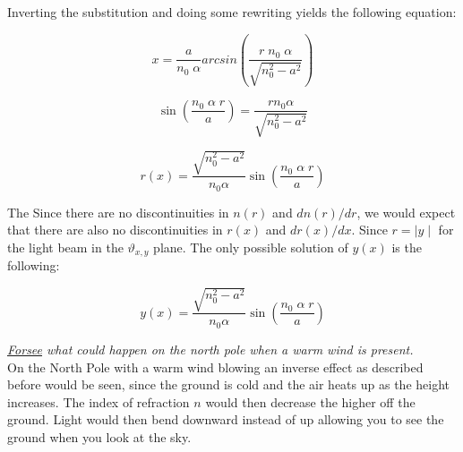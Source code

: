 \documentclass{article}
\begin{document}
Inverting the substitution and doing some rewriting yields the following equation:

\begin{equation}
	x = \frac{a}{n_0 \; \alpha} arcsin \left( \frac{r \; n_0 \; \alpha}{\sqrt{n_0^2-a^2}} \right)
\end{equation}

\begin{equation}
	\sin \left( \frac{n_0 \; \alpha \; r}{a} \right) =  \frac{r n_0 \alpha}{\sqrt{n_0^2-a^2}}
\end{equation}

\begin{equation}
	r(x) = \frac{\sqrt{n_0^2-a^2}}{n_0 \alpha} \sin \left( \frac{n_0 \; \alpha \; r}{a} \right) 
\end{equation}

The 
Since there are no discontinuities in $n(r)$ and $dn(r)/dr$, we would expect that there are also no discontinuities in $r(x)$ and $dr(x)/dx$. Since $r = \mid y \mid$ for the light beam in the $\vartheta _{x,y}$ plane. The only possible solution of $y(x)$ is the following:

\begin{equation}
	y(x) = \frac{\sqrt{n_0^2-a^2}}{n_0 \alpha} \sin \left( \frac{n_0 \; \alpha \; r}{a}\right) 
\end{equation}





\textit{\underline{Forsee} what could happen on the north pole when a warm wind is present.}\\
On the North Pole with a warm wind blowing an inverse effect as described before would be seen, since the ground is cold and the air heats up as the height increases. The index of refraction $n$ would then decrease the higher off the ground. Light would then bend downward instead of up allowing you to see the ground when you look at the sky.
\end{document}
